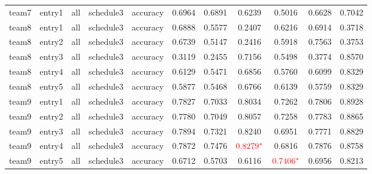 \begin{footnotesize}
\begin{tabular}{c|c|c|c|c|c|c|c|c|c|c}
team7&entry1&all&schedule3&accuracy&0.6964&0.6891&0.6239&0.5016&0.6628&0.7042\\
team8&entry1&all&schedule3&accuracy&0.6888&0.5577&0.2407&0.6216&0.6914&0.3718\\
team8&entry2&all&schedule3&accuracy&0.6739&0.5147&0.2416&0.5918&0.7563&0.3753\\
team8&entry3&all&schedule3&accuracy&0.3119&0.2455&0.7156&0.5498&0.3774&0.8570\\
team8&entry4&all&schedule3&accuracy&0.6129&0.5471&0.6856&0.5760&0.6099&0.8329\\
team8&entry5&all&schedule3&accuracy&0.5877&0.5468&0.6766&0.6139&0.5759&0.8329\\
team9&entry1&all&schedule3&accuracy&0.7827&0.7033&0.8034&0.7262&0.7806&0.8928\\
team9&entry2&all&schedule3&accuracy&0.7780&0.7049&0.8057&0.7258&0.7783&0.8865\\
team9&entry3&all&schedule3&accuracy&0.7894&0.7321&0.8240&0.6951&0.7771&0.8829\\
team9&entry4&all&schedule3&accuracy&0.7872&0.7476&{$\color{red}0.8279^*$}&0.6816&0.7876&0.8758\\
team9&entry5&all&schedule3&accuracy&0.6712&0.5703&0.6116&{$\color{red}0.7406^*$}&0.6956&0.8213\\
\end{tabular}
\end{footnotesize}